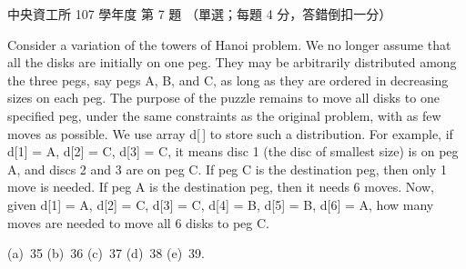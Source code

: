 \begin{pastexam}[label={px:ncu-107-dsa-07}]{中央資工所 107 學年度 第 7 題}
（單選；每題 4 分，答錯倒扣一分）

Consider a variation of the towers of Hanoi problem. We no longer assume that all the disks are
initially on one peg. They may be arbitrarily distributed among the three pegs, say pegs A, B, and
C, as long as they are ordered in decreasing sizes on each peg. The purpose of the puzzle remains
to move all disks to one specified peg, under the same constraints as the original problem, with
as few moves as possible. We use array d[\,] to store such a distribution. For example, if
d[1] = A, d[2] = C, d[3] = C, it means disc 1 (the disc of smallest size) is on peg A, and discs 2
and 3 are on peg C. If peg C is the destination peg, then only 1 move is needed. If peg A is the
destination peg, then it needs 6 moves. Now, given d[1] = A, d[2] = C, d[3] = C, d[4] = B,
d[5] = B, d[6] = A, how many moves are needed to move all 6 disks to peg C.

(a)~35 \qquad (b)~36 \qquad (c)~37 \qquad (d)~38 \qquad (e)~39.
\end{pastexam}

